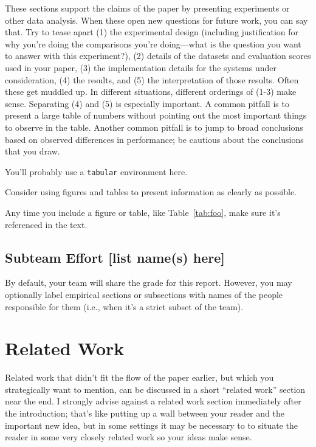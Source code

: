 \documentclass[11pt,letterpaper]{article}
\begin{document}
These sections support the claims of the paper by presenting experiments or other data analysis.  When these open new questions for future work, you can say that.  Try to tease apart (1) the experimental design (including justification for why you're doing the comparisons you're doing---what is the question you want to answer with this experiment?), (2) details of the datasets and evaluation scores used in your paper, (3) the implementation details for the systems under consideration, (4) the results, and (5) the interpretation of those results.  Often these get muddled up.  In different situations, different orderings of (1-3) make sense.  Separating (4) and (5) is especially important.  A common pitfall is to present a large table of numbers without pointing out the most important things to observe in the table.  Another common pitfall is to jump to broad conclusions based on observed differences in performance; be cautious about the conclusions that you draw.

\begin{table}
\begin{center}You'll probably use a \texttt{tabular} environment here.\end{center}
\caption{\label{tab:foo} Consider using figures and tables to present information as clearly as possible.}
\end{table}

Any time you include a figure or table, like Table~\ref{tab:foo}, make sure it's referenced in the text.

\subsection{Subteam Effort [list name(s) here]}

By default, your team will share the grade for this report.  However, you may optionally label empirical sections or subsections with names of the people responsible for them (i.e., when it's a strict subset of the team).


\section{Related Work}

Related work that didn't fit the flow of the paper earlier, but which you strategically want to mention, can be discussed in a short ``related work'' section near the end.  I strongly advise against a related work section immediately after the introduction; that’s like putting up a wall between your reader and the important new idea, but in some settings it may be necessary to to situate the reader in some very closely related work so your ideas make sense.
\end{document}
